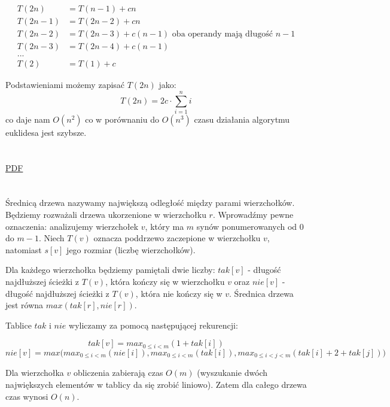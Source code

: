 \begin{equation*}
\begin{split}
T(2n) & = T(n-1) + cn \\
T(2n -1) & = T(2n - 2) + cn \\
T(2n - 2) & = T(2n - 3) + c(n-1)  \text{   oba operandy mają długość $n-1$} \\
T(2n - 3) & = T(2n - 4) + c(n-1) \\
... &  \\
T(2) &=  T(1) + c
\end{split}
\end{equation*}

\noindent Podstawieniami możemy zapisać $T(2n)$ jako:
$$ T(2n) = 2c\cdot \sum_{i=1}^n i $$
co daje nam $O(n^2)$ co w porównaniu do $O(n^3)$ czasu działania algorytmu euklidesa jest szybsze.
\section{} %
\href{https://github.com/edhell/hycaisd/raw/master/listy/2012/solutions/solutions/lista_3_zadanie_2.pdf}{PDF}

\section{} %
Średnicą drzewa nazywamy największą odległość między parami wierzchołków. Będziemy rozważali drzewa ukorzenione w wierzchołku $r$. Wprowadźmy pewne oznaczenia: analizujemy wierzchołek $v$, który ma $m$ synów ponumerowanych od $0$ do $m-1$. Niech $T(v)$ oznacza poddrzewo zaczepione w wierzchołku $v$, natomiast $s[v]$ jego rozmiar (liczbę wierzchołków).


\noindent Dla każdego wierzchołka będziemy pamiętali dwie liczby: $tak[v]$ - długość najdłuższej ścieżki z $T(v)$, która kończy się w wierzchołku $v$ oraz $nie[v]$ - długość najdłuższej ścieżki z $T(v)$, która nie kończy się w $v$. Średnica drzewa jest równa $max(tak[r], nie[r])$.

\noindent Tablice $tak$ i $nie$ wyliczamy za pomocą następującej rekurencji:

$$ tak[v] = max_{0\leq i < m}( 1 + tak[i] ) $$
$$ nie[v] = max\big( max_{0\leq i < m}( nie[i] ), max_{0\leq i < m}(tak[i]), max_{0\leq i <j<m}( tak[i]+2+tak[j]) \big) $$

\noindent Dla wierzchołka $v$ obliczenia zabierają czas $O(m)$ (wyszukanie dwóch największych elementów w tablicy da się zrobić liniowo). Zatem dla całego drzewa czas wynosi $O(n)$.

